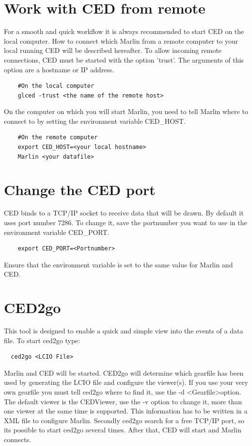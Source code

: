 \documentclass[a4paper,10pt]{article}
\begin{document}
\section{Work with CED from remote}
For a smooth and quick workflow it is always recommended to start CED on the local computer. How to connect which Marlin from a remote computer to your local running CED will be described hereafter.
\newline\newline
To allow incoming remote connections, CED must be started with the option 'trust'. The arguments of this option are a hostname or IP address.
\begin{verbatim}
    #On the local computer
    glced -trust <the name of the remote host>
\end{verbatim}
On the computer on which you will start Marlin, you need to tell Marlin where to connect to by setting the environment variable CED\_HOST.
\begin{verbatim}
    #On the remote computer
    export CED_HOST=<your local hostname>
    Marlin <your datafile>
\end{verbatim}

\section{Change the CED port}
CED binds to a TCP/IP socket to receive data that will be drawn. By default it uses port number 7286. To change it, save the portnumber you want to use in the environment variable CED\_PORT. 
\begin{verbatim}
    export CED_PORT=<Portnumber>
\end{verbatim}
Ensure that the environment variable is set to the same value for Marlin and CED.

\section{CED2go}
This tool is designed to enable a quick and simple view into the events of a data file. To start ced2go type:
 \begin{verbatim}
  ced2go <LCIO File>
 \end{verbatim}
Marlin and CED will be started.
\newline\newline
CED2go will determine which gearfile has been used by generating the LCIO file and configure the viewer(s). If you use your very own gearfile you must tell ced2go where to find it, use the -d \textless Gearfile\textgreater   option. The default viewer is the CEDViewer, use the -v option to change it, more than one viewer at the same time is supported. This information has to be written in a XML file to configure Marlin. Secondly ced2go  search for a free TCP/IP port, so its possible to start ced2go several times. After that, CED will start and Marlin connects.
 
\end{document}
